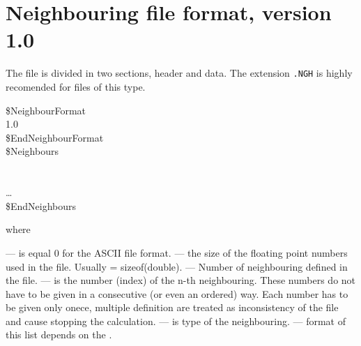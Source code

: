 %
%
%
%

\section*{Neighbouring file format, version 1.0}
The file is divided in two sections, header and data.
The extension {\tt .NGH} is highly recomended for files of this type.
\begin{fileformat}
\$NeighbourFormat\\
  1.0  \\
\$EndNeighbourFormat\\
\$Neighbours\\
  \\
    \\
  \dots\\
\$EndNeighbours\\
\end{fileformat}
where
\begin{description}
  --- is equal 0 for the ASCII file format.
  --- the size of the floating point numbers used in
  the file. Usually  = sizeof(double).
  --- Number of neighbouring defined in the
  file.
  --- is the number (index) of the n-th
  neighbouring. These numbers do not have to be given in a consecutive (or even an
  ordered) way. Each number has to be given only onece, multiple definition
  are treated as inconsistency of the file and cause stopping the
  calculation.
  --- is type of the neighbouring. 
  --- format of this list depends on the
  .
\end{description}
